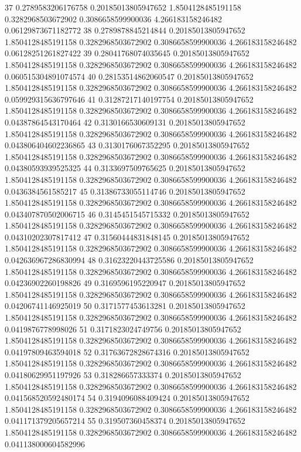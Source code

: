 {37 0.2789583206176758 0.20185013805947652 1.8504128485191158 0.3282968503672902 0.3086658599900036 4.266183158246482 0.06129873671182772
38 0.2789878845214844 0.20185013805947652 1.8504128485191158 0.3282968503672902 0.3086658599900036 4.266183158246482 0.06128251261827422
39 0.28041768074035645 0.20185013805947652 1.8504128485191158 0.3282968503672902 0.3086658599900036 4.266183158246482 0.060515304891074574
40 0.28153514862060547 0.20185013805947652 1.8504128485191158 0.3282968503672902 0.3086658599900036 4.266183158246482 0.059929315636797646
41 0.31287217140197754 0.20185013805947652 1.8504128485191158 0.3282968503672902 0.3086658599900036 4.266183158246482 0.04387864543170464
42 0.3130166530609131 0.20185013805947652 1.8504128485191158 0.3282968503672902 0.3086658599900036 4.266183158246482 0.043806404602236865
43 0.3130176067352295 0.20185013805947652 1.8504128485191158 0.3282968503672902 0.3086658599900036 4.266183158246482 0.04380593939525325
44 0.3133697509765625 0.20185013805947652 1.8504128485191158 0.3282968503672902 0.3086658599900036 4.266183158246482 0.0436384561585217
45 0.31386733055114746 0.20185013805947652 1.8504128485191158 0.3282968503672902 0.3086658599900036 4.266183158246482 0.043407870502006715
46 0.3145451545715332 0.20185013805947652 1.8504128485191158 0.3282968503672902 0.3086658599900036 4.266183158246482 0.04310202307817412
47 0.31560444831848145 0.20185013805947652 1.8504128485191158 0.3282968503672902 0.3086658599900036 4.266183158246482 0.042636967286830994
48 0.31623220443725586 0.20185013805947652 1.8504128485191158 0.3282968503672902 0.3086658599900036 4.266183158246482 0.04236902260198826
49 0.3169596195220947 0.20185013805947652 1.8504128485191158 0.3282968503672902 0.3086658599900036 4.266183158246482 0.04206741146925019
50 0.3171577453613281 0.20185013805947652 1.8504128485191158 0.3282968503672902 0.3086658599900036 4.266183158246482 0.0419876778998026
51 0.3171823024749756 0.20185013805947652 1.8504128485191158 0.3282968503672902 0.3086658599900036 4.266183158246482 0.04197809463594018
52 0.31763672828674316 0.20185013805947652 1.8504128485191158 0.3282968503672902 0.3086658599900036 4.266183158246482 0.04180629951197926
53 0.318286657333374 0.20185013805947652 1.8504128485191158 0.3282968503672902 0.3086658599900036 4.266183158246482 0.041568520592480174
54 0.3194096088409424 0.20185013805947652 1.8504128485191158 0.3282968503672902 0.3086658599900036 4.266183158246482 0.041171379205657214
55 0.319507360458374 0.20185013805947652 1.8504128485191158 0.3282968503672902 0.3086658599900036 4.266183158246482 0.041138000604582996
}
